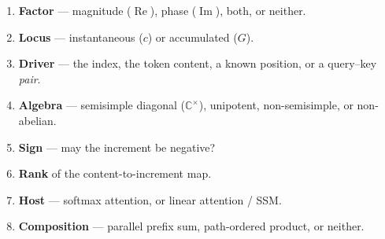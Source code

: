 \documentclass[11pt]{article}
\newcommand{\C}{\mathbb{C}}
\begin{document}
\begin{enumerate}\itemsep1pt
\item[\textbf{A1}] \textbf{Factor} --- magnitude ($\operatorname{Re}$), phase
  ($\operatorname{Im}$), both, or neither.
\item[\textbf{A2}] \textbf{Locus} --- instantaneous ($c$) or accumulated ($G$).
\item[\textbf{A3}] \textbf{Driver} --- the index, the token content, a known
  position, or a query--key \emph{pair}.
\item[\textbf{A4}] \textbf{Algebra} --- semisimple diagonal ($\C^\times$), unipotent,
  non-semisimple, or non-abelian.
\item[\textbf{A5}] \textbf{Sign} --- may the increment be negative?
\item[\textbf{A6}] \textbf{Rank} of the content-to-increment map.
\item[\textbf{A7}] \textbf{Host} --- softmax attention, or linear attention / SSM.
\item[\textbf{A8}] \textbf{Composition} --- parallel prefix sum, path-ordered
  product, or neither.
\end{enumerate}
\end{document}
